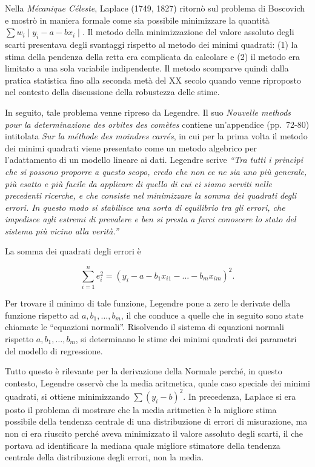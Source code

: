 \documentclass[
  11pt,
]{krantz}
\theoremstyle{definition}
\theoremstyle{definition}
\theoremstyle{definition}
\theoremstyle{definition}
\theoremstyle{remark}
\begin{document}
Nella \emph{Mécanique Céleste}, Laplace (1749, 1827) ritornò sul problema di Boscovich e mostrò in maniera formale come sia possibile minimizzare la quantità \(\sum w_i \mid y_i - a - b x_i \mid\). Il metodo della minimizzazione del valore assoluto degli scarti presentava degli svantaggi rispetto al metodo dei minimi quadrati: (1) la stima della pendenza della retta era complicata da calcolare e (2) il metodo era limitato a una sola variabile indipendente. Il metodo scomparve quindi dalla pratica statistica fino alla seconda metà del XX secolo quando venne riproposto nel contesto della discussione della robustezza delle stime.

In seguito, tale problema venne ripreso da Legendre. Il suo \emph{Nouvelle methods pour la determinazione des orbites des comètes} contiene un'appendice (pp.~72-80) intitolata \emph{Sur la méthode des moindres carrés}, in cui per la prima volta il metodo dei minimi quadrati viene presentato come un metodo algebrico per l'adattamento di un modello lineare ai dati. Legendre scrive \emph{``Tra tutti i princìpi che si possono proporre a questo scopo, credo che non ce ne sia uno più generale, più esatto e più facile da applicare di quello di cui ci siamo serviti nelle precedenti ricerche, e che consiste nel minimizzare la somma dei quadrati degli errori. In questo modo si stabilisce una sorta di equilibrio tra gli errori, che impedisce agli estremi di prevalere e ben si presta a farci conoscere lo stato del sistema più vicino alla verità.''}

La somma dei quadrati degli errori è

\[
\sum_{i=1}^n e_i^2 = (y_i - a - b_1x_{i1} - \dots - b_m x_{im})^2.
\]

Per trovare il minimo di tale funzione, Legendre pone a zero le derivate della funzione rispetto ad \(a, b_1, \dots, b_m\), il che conduce a quelle che in seguito sono state chiamate le ``equazioni normali''. Risolvendo il sistema di equazioni normali rispetto \(a, b_1, \dots, b_m\), si determinano le stime dei minimi quadrati dei parametri del modello di regressione.

Tutto questo è rilevante per la derivazione della Normale perché, in questo contesto, Legendre osservò che la media aritmetica, quale caso speciale dei minimi quadrati, si ottiene minimizzando \(\sum(y_i - b)^2\). In precedenza, Laplace si era posto il problema di mostrare che la media aritmetica è la migliore stima possibile della tendenza centrale di una distribuzione di errori di misurazione, ma non ci era riuscito perché aveva minimizzato il valore assoluto degli scarti, il che portava ad identificare la mediana quale migliore stimatore della tendenza centrale della distribuzione degli errori, non la media.
\end{document}
